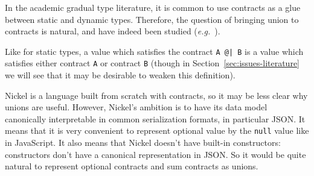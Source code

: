 \documentclass[sigplan,10pt]{acmart}
\newcommand{\nickel}[1]{\lstinline[language=nickel]{#1}}
\begin{document}
In the academic gradual type literature, it is common to use contracts
as a glue between static and dynamic types. Therefore, the question of
bringing union to contracts is natural, and have indeed been studied
(\emph{e.g.}~\cite{KeilThiemannUnionIntersection,RootCauseOfBlame}).

Like for static types, a value which satisfies the contract \nickel{A @| B}
is a value which satisfies either contract \nickel{A} or
contract \nickel{B} (though in Section~\ref{sec:issues-literature} we
will see that it may be desirable to weaken this definition).

Nickel is a language built from scratch with contracts, so it may be
less clear why unions are useful. However, Nickel's ambition is to
have its data model canonically interpretable in common serialization
formats, in particular JSON. It means that it is very convenient to
represent optional value by the \nickel{null} value like in
JavaScript. It also means that Nickel doesn't have built-in
constructors: constructors don't have a canonical representation in
JSON. So it would be quite natural to represent optional contracts and
sum contracts as unions.

%



\end{document}
